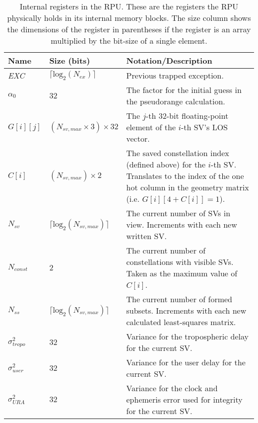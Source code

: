 \documentclass[11pt]{article}
\begin{document}
\begin{table}[htbp] \begin{center}
  \caption{Internal registers in the RPU. These are the registers the RPU physically holds in its internal memory blocks. The size column shows the dimensions of the register in parentheses if the register is an array multiplied by the bit-size of a single element.}
  \label{tab:rpu_internal_registers}
  \begin{tabular}{|m{1.5cm}|m{2.5cm}|m{7cm}|}
    \hline

    \textbf{Name} & \textbf{Size (bits)} & \textbf{Notation/Description}\\ \hline

    \emph{EXC} & $\lceil{\text{log}_2(N_{ex})}\rceil$ & Previous trapped exception.\\ \hline

    $\alpha_0$ & $32$ & The factor for the initial guess in the pseudorange calculation.\\ \hline

    $G[i][j]$ & $(N_{sv,max} \times 3) \times 32$ & The $j$-th 32-bit floating-point element of the $i$-th SV's LOS vector.\\ \hline

    $C[i]$ & $(N_{sv,max}) \times 2$ & The saved constellation index (defined above) for the $i$-th SV. Translates to the index of the one hot column in the geometry matrix (i.e. $G[i][4+C[i]]=1$).\\ \hline

    $N_{sv}$ & $\lceil{\text{log}_2(N_{sv,max})}\rceil$ & The current number of SVs in view. Increments with each new written SV.\\ \hline

    $N_{const}$ & $2$ & The current number of constellations with visible SVs. Taken as the maximum value of $C[i]$.\\ \hline

    $N_{ss}$ & $\lceil{\text{log}_2(N_{sv,max})}\rceil$ & The current number of formed subsets. Increments with each new calculated least-squares matrix.\\ \hline

    $\sigma_{tropo}^2$ & $32$ & Variance for the tropospheric delay for the current SV.\\ \hline

    $\sigma_{user}^2$ & $32$ & Variance for the user delay for the current SV.\\ \hline

    $\sigma_{URA}^2$ & $32$ & Variance for the clock and ephemeris error used for integrity for the current SV.\\ \hline


\end{tabular}
\end{center}
\end{table}
\end{document}
